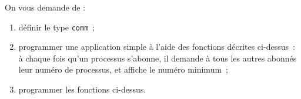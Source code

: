 On vous demande de :

\begin {enumerate}

    \item définir le type {\tt comm}~;

    \item programmer une application simple à l'aide des fonctions
	décrites ci-dessus~: à chaque fois qu'un processus s'abonne, il
	demande à tous les autres abonnés leur numéro de processus, et
	affiche le numéro minimum~;
    
    \item programmer les fonctions ci-dessus.

\end {enumerate}



